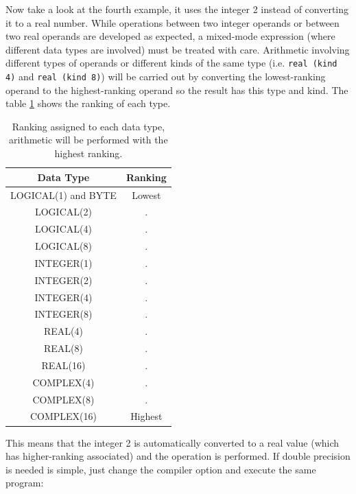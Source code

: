 Now take a look at the fourth example, it uses the integer 2 instead of converting it to a real number. While operations between two integer operands or between two real operands are developed as expected, a mixed-mode expression (where different data types are involved) must be treated with care. Arithmetic involving different types of operands or different kinds of the same type (i.e. \texttt{real (kind 4)} and \texttt{real (kind 8)}) will be carried out by converting the lowest-ranking operand to the highest-ranking operand so the result has this type and kind. The table \ref{tab:ranking} shows the ranking of each type. 

\begin{table}[h]
    \begin{tabular}{| c | c |}
        
        \hline
        Data Type & Ranking \\ \hline
        LOGICAL(1) and BYTE & Lowest \\ \hline
        LOGICAL(2)     &  . \\ \hline
        LOGICAL(4)     &  . \\ \hline
        LOGICAL(8)      & . \\ \hline
        INTEGER(1)     &  . \\ \hline
        INTEGER(2)    &   . \\ \hline
        INTEGER(4)    &   . \\ \hline
        INTEGER(8)    &   . \\ \hline
        REAL(4)     &  . \\ \hline
        REAL(8)     &    .   \\ \hline
        REAL(16)    &   . \\ \hline
        COMPLEX(4)  &     . \\ \hline
        COMPLEX(8)  &     . \\ \hline
        COMPLEX(16) &    Highest\\ \hline
        
        
    \end{tabular}                                                       
    \caption{Ranking assigned to each data type, arithmetic will be performed with the highest ranking.}
    \label{tab:ranking}
\end{table}

This means that the integer 2 is automatically converted to a real value (which has higher-ranking associated) and the operation is performed. If double precision is needed is simple, just change the compiler option and execute the same program:

